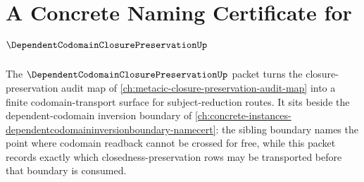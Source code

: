 \chapter{A Concrete Naming Certificate for $\DependentCodomainClosurePreservationUp$}
\label{ch:concrete-instances-dependent-codomain-closure-preservation-namecert}

The $\DependentCodomainClosurePreservationUp$ packet turns the closure-preservation audit map of \autoref{ch:metacic-closure-preservation-audit-map} into a finite codomain-transport surface for subject-reduction routes. It sits beside the dependent-codomain inversion boundary of \autoref{ch:concrete-instances-dependentcodomaininversionboundary-namecert}: the sibling boundary names the point where codomain readback cannot be crossed for free, while this packet records exactly which closedness-preservation rows may be transported before that boundary is consumed.

